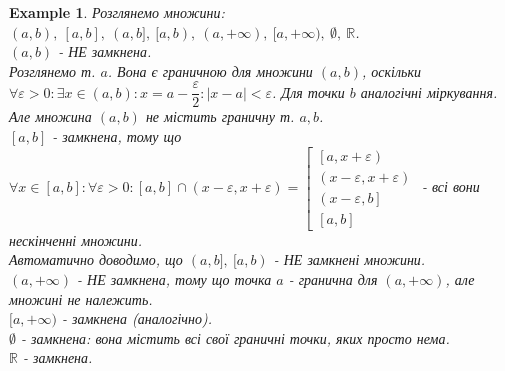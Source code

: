 \documentclass[a4paper, 14pt]{article}
\theoremstyle{theoremdd}
\theoremstyle{theoremdd}
\theoremstyle{theoremdd}
\theoremstyle{theoremdd}
\newtheorem{example}[theorem]{Example}
\theoremstyle{theoremdd}
\theoremstyle{theoremdd}
\theoremstyle{theoremdd}
\theoremstyle{theoremdd}
\begin{document}
\begin{example}
Розглянемо множини: $(a,b), \ [a,b], \ (a,b], \ [a,b), \ (a,+\infty), \ [a,+\infty), \ \emptyset, \ \mathbb{R}$.\\
$(a,b)$ - НЕ замкнена.\\
Розглянемо т. $a$. Вона є граничною для множини $(a,b)$, оскільки $\forall \varepsilon > 0: \exists x \in (a,b): x = a - \dfrac{\varepsilon}{2}: |x-a| < \varepsilon$. Для точки $b$ аналогічні міркування. Але множина $(a,b)$ не містить граничну т. $a,b$.
\bigskip \\

$[a,b]$ - замкнена, тому що $\forall x \in [a,b]: \forall \varepsilon > 0: [a,b] \cap (x-\varepsilon,x+\varepsilon) = \left[
\begin{array}{l}
\left[a,x+\varepsilon \right) \\
\left(x-\varepsilon, x + \varepsilon \right) \\
\left(x - \varepsilon, b\right] \\
\left[a,b\right]
\end{array}
 \right.$ - всі вони нескінченні множини.
\bigskip \\
Автоматично доводимо, що $(a,b], \ [a,b)$ - НЕ замкнені множини.
\bigskip \\
$(a,+\infty)$ - НЕ замкнена, тому що точка $a$ - гранична для $(a,+\infty)$, але множині не належить.
\bigskip \\
$[a,+\infty)$ - замкнена (аналогічно).
\bigskip \\
$\emptyset$ - замкнена: вона містить всі свої граничні точки, яких просто нема.
\bigskip \\
$\mathbb{R}$ - замкнена.
\end{example}
\end{document}
